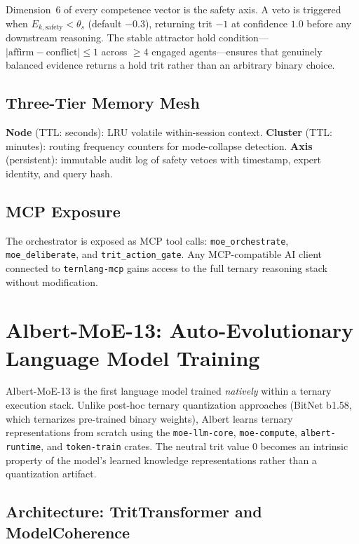 \documentclass[journal,10pt,twocolumn]{IEEEtran}
\begin{document}
Dimension~6 of every competence vector is the safety axis. A veto is
triggered when $E_{k,\text{safety}} < \theta_s$ (default $-0.3$), returning
trit $-1$ at confidence $1.0$ before any downstream reasoning. The stable
attractor hold condition---$|\text{affirm} - \text{conflict}| \leq 1$ across
$\geq 4$ engaged agents---ensures that genuinely balanced evidence returns a
hold trit rather than an arbitrary binary choice.

\subsection{Three-Tier Memory Mesh}

\textbf{Node} (TTL: seconds): LRU volatile within-session context.
\textbf{Cluster} (TTL: minutes): routing frequency counters for mode-collapse
detection. \textbf{Axis} (persistent): immutable audit log of safety vetoes
with timestamp, expert identity, and query hash.

\subsection{MCP Exposure}

The orchestrator is exposed as MCP tool calls: \texttt{moe\_orchestrate},
\texttt{moe\_deliberate}, and \texttt{trit\_action\_gate}. Any MCP-compatible
AI client connected to \texttt{ternlang-mcp} gains access to the full ternary
reasoning stack without modification.

\section{Albert-MoE-13: Auto-Evolutionary Language Model Training}
\label{sec:albert}

Albert-MoE-13 is the first language model trained \emph{natively} within a
ternary execution stack. Unlike post-hoc ternary quantization approaches
(BitNet b1.58, which ternarizes pre-trained binary weights), Albert learns
ternary representations from scratch using the \texttt{moe-llm-core},
\texttt{moe-compute}, \texttt{albert-runtime}, and \texttt{token-train}
crates. The neutral trit value $0$ becomes an intrinsic property of the
model's learned knowledge representations rather than a quantization artifact.

\subsection{Architecture: TritTransformer and ModelCoherence}
\end{document}
